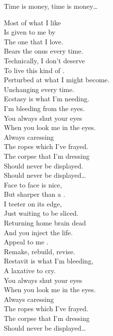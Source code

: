 Time is money, time is money… \\




Most of what I like \\
Is given to me by \\
The one that I love. \\
Bears the onus every time. \\

Technically, I don't deserve \\
To live this kind of . \\
Perturbed at what I might become. \\
Unchanging every time. \\

Ecstasy is what I'm needing. \\
I'm bleeding from the eyes. \\
You always shut your eyes \\
When you look me in the eyes. \\

Always caressing \\
The ropes which I've frayed. \\
The corpse that I'm dressing \\
Should never be displayed. \\
Should never be displayed… \\

Face to face is nice, \\
But sharper than a . \\
I teeter on its edge, \\
Just waiting to be sliced. \\

Returning home brain dead \\
And you inject the life. \\
Appeal to me . \\
Remake, rebuild, revise. \\

Restavit is what I'm bleeding, \\
A laxative to cry. \\
You always shut your eyes \\
When you look me in the eyes. \\

Always caressing \\
The ropes which I've frayed. \\
The corpse that I'm dressing \\
Should never be displayed… \\




